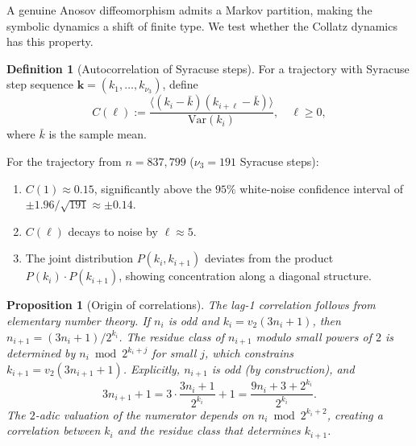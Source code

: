 \documentclass[11pt,a4paper]{article}
\theoremstyle{plain}
\newtheorem{proposition}[theorem]{Proposition}
\theoremstyle{definition}
\newtheorem{definition}[theorem]{Definition}
\begin{document}
A genuine Anosov diffeomorphism admits a Markov partition, making the symbolic dynamics a shift of finite type. We test whether the Collatz dynamics has this property.

\begin{definition}[Autocorrelation of Syracuse steps]
    For a trajectory with Syracuse step sequence $\mathbf{k} = (k_1, \ldots, k_{\nu_3})$, define
    \begin{equation}
        C(\ell) := \frac{\langle (k_i - \bar{k})(k_{i+\ell} - \bar{k}) \rangle}{\mathrm{Var}(k_i)}, \quad \ell \geq 0,
    \end{equation}
    where $\bar{k}$ is the sample mean.
\end{definition}

\begin{empirical}\label{obs:autocorr}
    For the trajectory from $n = 837{,}799$ ($\nu_3 = 191$ Syracuse steps):
    \begin{enumerate}
        \item $C(1) \approx 0.15$, significantly above the $95\%$ white-noise confidence interval of $\pm 1.96/\sqrt{191} \approx \pm 0.14$.
        \item $C(\ell)$ decays to noise by $\ell \approx 5$.
        \item The joint distribution $P(k_i, k_{i+1})$ deviates from the product $P(k_i) \cdot P(k_{i+1})$, showing concentration along a diagonal structure.
    \end{enumerate}
\end{empirical}

\begin{proposition}[Origin of correlations]\label{prop:correlations}
    The lag-1 correlation follows from elementary number theory. If $n_i$ is odd and $k_i = v_2(3n_i + 1)$, then $n_{i+1} = (3n_i + 1)/2^{k_i}$. The residue class of $n_{i+1}$ modulo small powers of $2$ is determined by $n_i \bmod 2^{k_i + j}$ for small $j$, which constrains $k_{i+1} = v_2(3n_{i+1} + 1)$. Explicitly, $n_{i+1}$ is odd (by construction), and
    \begin{equation}
        3n_{i+1} + 1 = 3 \cdot \frac{3n_i + 1}{2^{k_i}} + 1 = \frac{9n_i + 3 + 2^{k_i}}{2^{k_i}}.
    \end{equation}
    The $2$-adic valuation of the numerator depends on $n_i \bmod 2^{k_i + 2}$, creating a correlation between $k_i$ and the residue class that determines $k_{i+1}$.
\end{proposition}
\end{document}
